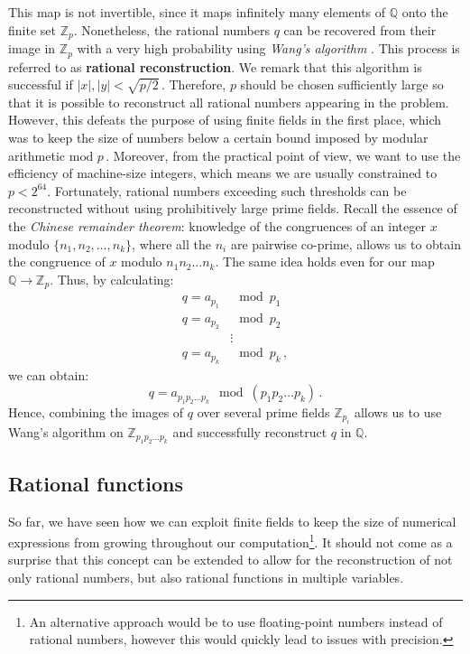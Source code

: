 \documentclass[main.tex]{subfiles}
\begin{document}
This map is not invertible, since it maps infinitely many elements of $\mathbb{Q}$ onto the finite set $\mathbb{Z}_p$. Nonetheless, the rational numbers $q$ can be recovered from their image in $\mathbb{Z}_p$ with a very high probability using \textit{Wang's algorithm} \cite{10.1145/800206.806398, 10.1145/1089292.1089293}. This process is referred to as \textbf{rational reconstruction}. We remark that this algorithm is successful if  $|x|, |y| < \sqrt{p/2}\,$. Therefore, $p$ should be chosen sufficiently large so that it is possible to reconstruct all rational numbers appearing in the problem. However, this defeats the purpose of using finite fields in the first place, which was to keep the size of numbers below a certain bound imposed by modular arithmetic $\text{mod } p\,$. Moreover, from the practical point of view, we want to use the efficiency of machine-size integers, which means we are usually constrained to $p<2^{64}$. Fortunately, rational numbers exceeding such thresholds can be reconstructed without using prohibitively large prime fields. Recall the essence of the \textit{Chinese remainder theorem}: knowledge of the congruences of an integer $x$ modulo $\{n_1, n_2, \ldots, n_k\}$, where all the $n_i$ are pairwise co-prime, allows us to obtain the congruence of $x$ modulo $n_1n_2\ldots n_k$. The same idea holds even for our map $\mathbb{Q} \rightarrow \mathbb{Z}_p$. Thus, by calculating:
\begin{align}
    q = a_{p_1} &\mod p_1 \nonumber \\
    q = a_{p_2} &\mod p_2 \nonumber \\
    &\vdots \nonumber \\
    q = a_{p_k} &\mod p_k\,,
\end{align}
we can obtain:
\begin{equation}
    q = a_{p_1 p_2 \ldots p_k} \mod (p_1 p_2 \ldots p_k)\,.
\end{equation}
Hence, combining the images of $q$ over several prime fields $\mathbb{Z}_{p_i}$ allows us to use Wang's algorithm on $\mathbb{Z}_{p_1 p_2 \ldots p_k}$ and successfully reconstruct $q$ in $\mathbb{Q}$.
\subsection{Rational functions} \label{sec:ratfuncs}
So far, we have seen how we can exploit finite fields to keep the size of numerical expressions from growing throughout our computation\footnote{An alternative approach would be to use floating-point numbers instead of rational numbers, however this would quickly lead to issues with precision.}. It should not come as a surprise that this concept can be extended to allow for the reconstruction of not only rational numbers, but also rational functions in multiple variables. 
\end{document}
